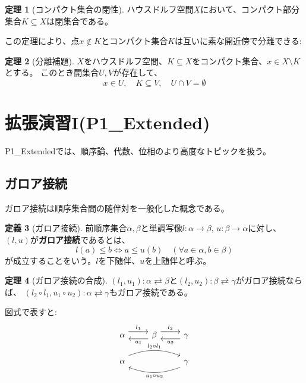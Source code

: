 \documentclass[a4paper,12pt]{ltjsarticle}
\theoremstyle{definition}
\newtheorem{theorem}{定理}[section]
\newtheorem{definition}[theorem]{定義}
\begin{document}
\begin{theorem}[コンパクト集合の閉性]\label{thm:compact-closed}
ハウスドルフ空間$X$において、コンパクト部分集合$K \subseteq X$は閉集合である。
\end{theorem}

この定理により、点$x \notin K$とコンパクト集合$K$は互いに素な開近傍で分離できる:

\begin{theorem}[分離補題]\label{thm:separation}
$X$をハウスドルフ空間、$K \subseteq X$をコンパクト集合、$x \in X \setminus K$とする。
このとき開集合$U, V$が存在して、
\[
x \in U, \quad K \subseteq V, \quad U \cap V = \emptyset
\]
\end{theorem}

\section{拡張演習I(P1\_Extended)}

P1\_Extendedでは、順序論、代数、位相のより高度なトピックを扱う。

\subsection{ガロア接続}
ガロア接続は順序集合間の随伴対を一般化した概念である。

\begin{definition}[ガロア接続]\label{def:galois-connection}
前順序集合$\alpha, \beta$と単調写像$l: \alpha \to \beta$, $u: \beta \to \alpha$に対し、
$(l, u)$が\textbf{ガロア接続}であるとは、
\[
l(a) \le b \iff a \le u(b) \quad (\forall a \in \alpha, b \in \beta)
\]
が成立することをいう。$l$を下随伴、$u$を上随伴と呼ぶ。
\end{definition}

\begin{theorem}[ガロア接続の合成]\label{thm:galois-composition}
$(l_1, u_1): \alpha \rightleftarrows \beta$と$(l_2, u_2): \beta \rightleftarrows \gamma$がガロア接続ならば、
$(l_2 \circ l_1, u_1 \circ u_2): \alpha \rightleftarrows \gamma$もガロア接続である。
\end{theorem}

図式で表すと:
\begin{equation*}
\begin{tikzcd}
\alpha \arrow[r, shift left=1ex, "l_1"] & \beta \arrow[l, shift left=1ex, "u_1"] \arrow[r, shift left=1ex, "l_2"] & \gamma \arrow[l, shift left=1ex, "u_2"] \\
\alpha \arrow[rr, shift left=1ex, bend left=20, "l_2 \circ l_1"] & & \gamma \arrow[ll, shift left=1ex, bend left=20, "u_1 \circ u_2"]
\end{tikzcd}
\end{equation*}
\end{document}
